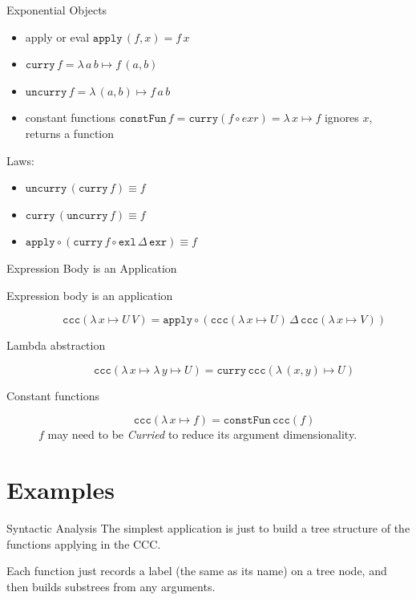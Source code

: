 \documentclass[10pt]{beamer}
\newcommand{\apply}{\mathtt{apply}}
\newcommand{\curry}{\mathtt{curry}}
\newcommand{\uncurry}{\mathtt{uncurry}}
\newcommand{\exl}{\mathtt{exl}}
\newcommand{\exr}{\mathtt{exr}}
\newcommand{\lamf}[2]{\ensuremath{\lambda\, #1 \mapsto #2}}
\newcommand{\ccc}{\ensuremath{\mathtt{ccc}}}
\newcommand{\lamtoccc}[1]{\ensuremath{\ccc (#1)}}
\newcommand{\delprod}[2]{\ensuremath{#1\,\Delta\,#2}}
\newcommand{\constFun}{\ensuremath{\mathtt{constFun}}}
\theoremstyle{definition}
\theoremstyle{remark}
\numberwithin{equation}{section}
\begin{document}
\begin{frame}[fragile]{Exponential Objects}
  \begin{itemize}
  \item apply or eval $\apply\, (f,x) = f\,x$
  \item $\curry\, f = \lamf{a\,b}{f\,(a,b)}$
  \item $\uncurry\, f = \lamf{(a,b)}{f\,a\,b}$
  \item constant functions $\constFun\, f = \curry (f \circ exr) = \lamf{x}{f}$ ignores $x$, returns a function
  \end{itemize}
  
  Laws:\\
  \begin{itemize}
  \item $\uncurry\,(\curry\,f) \equiv f$
  \item $\curry\,(\uncurry\,f) \equiv f$
  \item $\apply \circ (\delprod{\curry\,f\circ\exl}{\exr}) \equiv f$
  \end{itemize}
\end{frame}

\begin{frame}[fragile]{Expression Body is an Application}
  \begin{description}
    \item[Expression body is an application]
      $$\lamtoccc{\lamf{x}{U\,V}} = \apply \circ (\delprod{\lamtoccc{\lamf{x}{U}}}{\lamtoccc{\lamf{x}{V}}})$$
    \item[Lambda abstraction]
      $$\lamtoccc{\lamf{x}{\lamf{y}{U}}} = \curry\, \lamtoccc{\lamf{(x,y)}{U}}$$
    \item[Constant functions]
      $$\lamtoccc{\lamf{x}{f}} = \constFun\, \lamtoccc{f}$$
      $f$ may need to be \emph{Curried} to reduce its argument dimensionality.
  \end{description}
\end{frame}

\section{Examples} %

\begin{frame}[fragile]{Syntactic Analysis}
  The simplest application is just to build a tree structure of the functions applying in the CCC.

  Each function just records a label (the same as its name) on a tree node, and then builds substrees from any arguments.
\end{frame}
\end{document}
